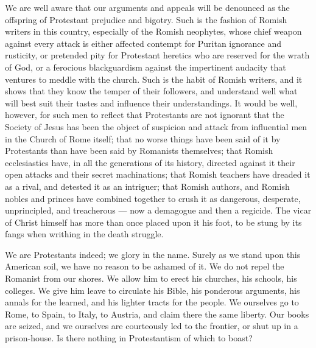 \documentclass[]{book}
\begin{document}
We are well aware that our arguments and appeals will be denounced as the offspring of Protestant prejudice and bigotry. Such is the fashion of Romish writers in this country, especially of the Romish neophytes, whose chief weapon against every attack is either affected contempt for Puritan ignorance and rusticity, or pretended pity for Protestant heretics who are reserved for the wrath of God, or a ferocious blackguardism against the impertinent audacity that ventures to meddle with the church. Such is the habit of Romish writers, and it shows that they know the temper of their followers, and understand well what will best suit their tastes and influence their understandings. It would be well, however, for such men to reflect that Protestants are not ignorant that the Society of Jesus has been the object of suspicion and attack from influential men in the Church of Rome itself; that no worse things have been said of it by Protestants than have been said by Romanists themselves; that Romish ecclesiastics have, in all the generations of its history, directed against it their open attacks and their secret machinations; that Romish teachers have dreaded it as a rival, and detested it as an intriguer; that Romish authors, and Romish nobles and princes have combined together to crush it as dangerous, desperate, unprincipled, and treacherous --- now a demagogue and then a regicide. The vicar of Christ himself has more than once placed upon it his foot, to be stung by its fangs when writhing in the death struggle.

We are Protestants indeed; we glory in the name. Surely as we stand upon this American soil, we have no reason to be ashamed of it. We do not repel the Romanist from our shores. We allow him to erect his churches, his schools, his colleges. We give him leave to circulate his Bible, his ponderous arguments, his annals for the learned, and his lighter tracts for the people. We ourselves go to Rome, to Spain, to Italy, to Austria, and claim there the same liberty. Our books are seized, and we ourselves are courteously led to the frontier, or shut up in a prison-house. Is there nothing in Protestantism of which to boast?
\end{document}

